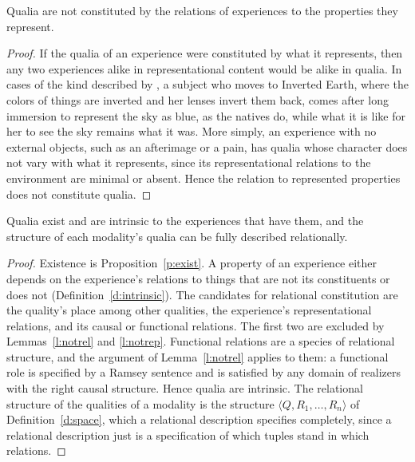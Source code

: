 \documentclass{situationist-preprint}
\begin{document}
\begin{lemma}\label{l:notrep}
Qualia are not constituted by the relations of experiences to the properties they represent.
\end{lemma}

\begin{proof}
If the qualia of an experience were constituted by what it represents, then any two experiences alike in representational content would be alike in qualia. In cases of the kind described by \citet{Block1990}, a subject who moves to Inverted Earth, where the colors of things are inverted and her lenses invert them back, comes after long immersion to represent the sky as blue, as the natives do, while what it is like for her to see the sky remains what it was. More simply, an experience with no external objects, such as an afterimage or a pain, has qualia whose character does not vary with what it represents, since its representational relations to the environment are minimal or absent. Hence the relation to represented properties does not constitute qualia.
\end{proof}

\begin{theorem}\label{t:main}
Qualia exist and are intrinsic to the experiences that have them, and the structure of each modality's qualia can be fully described relationally.
\end{theorem}

\begin{proof}
Existence is Proposition~\ref{p:exist}. A property of an experience either depends on the experience's relations to things that are not its constituents or does not (Definition~\ref{d:intrinsic}). The candidates for relational constitution are the quality's place among other qualities, the experience's representational relations, and its causal or functional relations. The first two are excluded by Lemmas~\ref{l:notrel} and \ref{l:notrep}. Functional relations are a species of relational structure, and the argument of Lemma~\ref{l:notrel} applies to them: a functional role is specified by a Ramsey sentence and is satisfied by any domain of realizers with the right causal structure. Hence qualia are intrinsic. The relational structure of the qualities of a modality is the structure $\langle Q, R_1,\ldots,R_n\rangle$ of Definition~\ref{d:space}, which a relational description specifies completely, since a relational description just is a specification of which tuples stand in which relations.
\end{proof}
\end{document}
